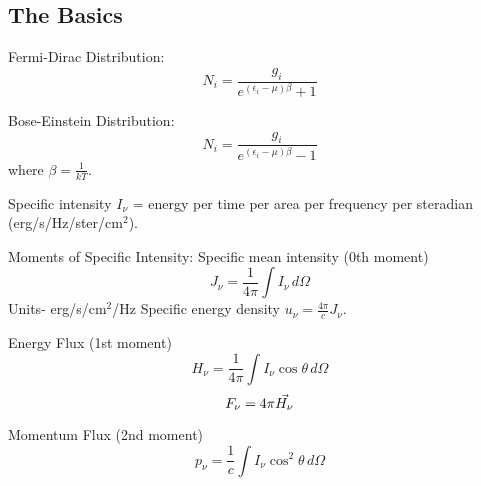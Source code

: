 \subsection{The Basics}
Fermi-Dirac Distribution:
\begin{displaymath}N_i=\frac{g_i}{e^{(\epsilon_i-\mu)\beta}+1}\end{displaymath}

Bose-Einstein Distribution:
\begin{displaymath}N_i=\frac{g_i}{e^{(\epsilon_i-\mu)\beta}-1}\end{displaymath}
where $\beta=\frac{1}{kT}$.

Specific intensity $I_{\nu}$ = energy per time per area per frequency per
steradian (erg/s/Hz/ster/cm$^2$).

Moments of Specific Intensity:\newline
Specific mean intensity (0th moment)\newline
\begin{displaymath}J_{\nu}=\frac{1}{4\pi}\int I_{\nu}\,d\Omega \end{displaymath}
Units- erg/s/cm$^2$/Hz\newline
Specific energy density $u_{\nu}=\frac{4\pi}{c}J_{\nu}$.

Energy Flux (1st moment)\newline
\begin{displaymath}H_{\nu}=\frac{1}{4\pi}\int I_{\nu}\cos \theta\,d\Omega \end{displaymath}
\begin{displaymath}F_{\nu}=4\pi \vec{H_{\nu}} \end{displaymath}

Momentum Flux (2nd moment)\newline
\begin{displaymath}p_{\nu}=\frac{1}{c}\int I_{\nu}\cos^2 \theta\,d\Omega  \end{displaymath}
